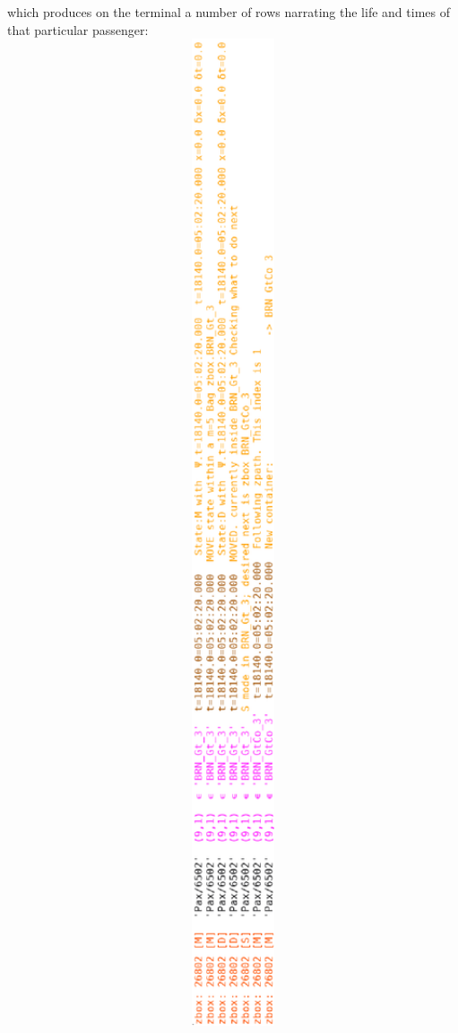 
which produces on the terminal a number of rows narrating the life and times of that
particular passenger:\\
\includegraphics[angle=270,width=16cm]{70_figs/Pax_6502a.eps}\\
